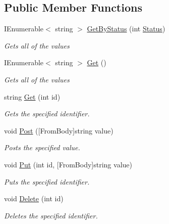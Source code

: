 \subsection*{Public Member Functions}
\begin{DoxyCompactItemize}
\item 
I\+Enumerable$<$ string $>$ \hyperlink{class_open_1_1_g_i_1_1hypermart_1_1_controllers_1_1_a_p_i_1_1_values_controller_a0f58764e60950048b68217098361ea62}{Get\+By\+Status} (int \hyperlink{class_open_1_1_g_i_1_1hypermart_1_1_status}{Status})
\begin{DoxyCompactList}\small\item\em Gets all of the values \end{DoxyCompactList}\item 
I\+Enumerable$<$ string $>$ \hyperlink{class_open_1_1_g_i_1_1hypermart_1_1_controllers_1_1_a_p_i_1_1_values_controller_a22701a876d9570628f81c46396db9470}{Get} ()
\begin{DoxyCompactList}\small\item\em Gets all of the values \end{DoxyCompactList}\item 
string \hyperlink{class_open_1_1_g_i_1_1hypermart_1_1_controllers_1_1_a_p_i_1_1_values_controller_a939097635499ed1d2f82186a1d85d2d4}{Get} (int id)
\begin{DoxyCompactList}\small\item\em Gets the specified identifier. \end{DoxyCompactList}\item 
void \hyperlink{class_open_1_1_g_i_1_1hypermart_1_1_controllers_1_1_a_p_i_1_1_values_controller_a4b0c28944cf2577d0883f17466b45453}{Post} (\mbox{[}From\+Body\mbox{]}string value)
\begin{DoxyCompactList}\small\item\em Posts the specified value. \end{DoxyCompactList}\item 
void \hyperlink{class_open_1_1_g_i_1_1hypermart_1_1_controllers_1_1_a_p_i_1_1_values_controller_a1639499e0a18f82e61335c94c344ad31}{Put} (int id, \mbox{[}From\+Body\mbox{]}string value)
\begin{DoxyCompactList}\small\item\em Puts the specified identifier. \end{DoxyCompactList}\item 
void \hyperlink{class_open_1_1_g_i_1_1hypermart_1_1_controllers_1_1_a_p_i_1_1_values_controller_aac5ef946899bcf7c07bdf860004f8c1a}{Delete} (int id)
\begin{DoxyCompactList}\small\item\em Deletes the specified identifier. \end{DoxyCompactList}\end{DoxyCompactItemize}


